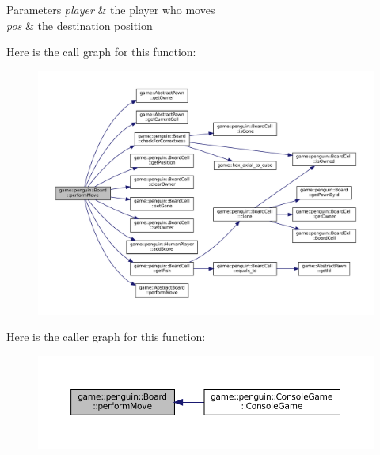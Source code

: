 \begin{DoxyParams}{Parameters}
{\em player} & the player who moves \\
\hline
{\em pos} & the destination position \\
\hline
\end{DoxyParams}
Here is the call graph for this function\+:
\nopagebreak
\begin{figure}[H]
\begin{center}
\leavevmode
\includegraphics[width=350pt]{classgame_1_1penguin_1_1_board_af297dc572afb02dafc61e3b8e849338f_cgraph}
\end{center}
\end{figure}
Here is the caller graph for this function\+:
\nopagebreak
\begin{figure}[H]
\begin{center}
\leavevmode
\includegraphics[width=350pt]{classgame_1_1penguin_1_1_board_af297dc572afb02dafc61e3b8e849338f_icgraph}
\end{center}
\end{figure}
\mbox{\label{classgame_1_1penguin_1_1_board_a45ecb5bba50b4d03592ac4ddf9255b49}} 
